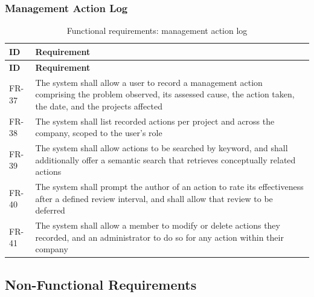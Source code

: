 \subsubsection{Management Action Log}

\begin{longtable}{
  >{\raggedright\arraybackslash}p{}
  >{\raggedright\arraybackslash}p{}
}
\caption{Functional requirements: management action log}
\label{tab:fr-actions}\\
\toprule
\textbf{ID} & \textbf{Requirement} \\
\midrule
\endfirsthead
\toprule
\textbf{ID} & \textbf{Requirement} \\
\midrule
\endhead
\bottomrule
\endlastfoot
FR-37 & The system shall allow a user to record a management action comprising the
problem observed, its assessed cause, the action taken, the date, and the projects
affected \\
\addlinespace
FR-38 & The system shall list recorded actions per project and across the company,
scoped to the user's role \\
\addlinespace
FR-39 & The system shall allow actions to be searched by keyword, and shall
additionally offer a semantic search that retrieves conceptually related actions \\
\addlinespace
FR-40 & The system shall prompt the author of an action to rate its effectiveness
after a defined review interval, and shall allow that review to be deferred \\
\addlinespace
FR-41 & The system shall allow a member to modify or delete actions they recorded,
and an administrator to do so for any action within their company \\
\end{longtable}

\subsection{Non-Functional Requirements}
\label{subsec:non-functional-requirements}

